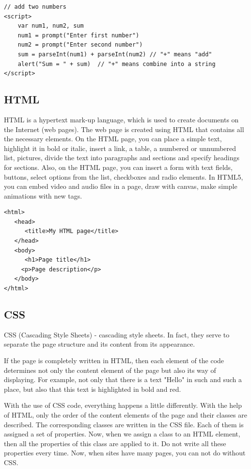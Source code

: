 \begin{verbatim}
// add two numbers
<script>
    var num1, num2, sum
    num1 = prompt("Enter first number")
    num2 = prompt("Enter second number")
    sum = parseInt(num1) + parseInt(num2) // "+" means "add"
    alert("Sum = " + sum)  // "+" means combine into a string
</script>
\end{verbatim}
\cite{JavaScriptCode}

\subsection{HTML}
HTML is a hypertext mark-up language, which is used to create documents on the Internet (web pages). The web page is created using HTML that contains all the necessary elements. On the HTML page, you can place a simple text, highlight it in bold or italic, insert a link, a table, a numbered or unnumbered list, pictures, divide the text into paragraphs and sections and specify headings for sections. Also, on the HTML page, you can insert a form with text fields, buttons, select options from the list, checkboxes and radio elements. In HTML5, you can embed video and audio files in a page, draw with canvas, make simple animations with new tags. \cite{html}

\begin{verbatim}
<html>
   <head>
      <title>My HTML page</title>
   </head>
   <body>
      <h1>Page title</h1>
     <p>Page description</p>
   </body>
</html>
\end{verbatim}

\subsection{CSS}
CSS (Cascading Style Sheets) - cascading style sheets. In fact, they serve to separate the page structure and its content from its appearance.\par If the page is completely written in HTML, then each element of the code determines not only the content element of the page but also its way of displaying. For example, not only that there is a text "Hello" in such and such a place, but also that this text is highlighted in bold and red.\par With the use of CSS code, everything happens a little differently. With the help of HTML, only the order of the content elements of the page and their classes are described. The corresponding classes are written in the CSS file. Each of them is assigned a set of properties. Now, when we assign a class to an HTML element, then all the properties of this class are applied to it. Do not write all these properties every time. Now, when sites have many pages, you can not do without CSS. \cite{CSS}

